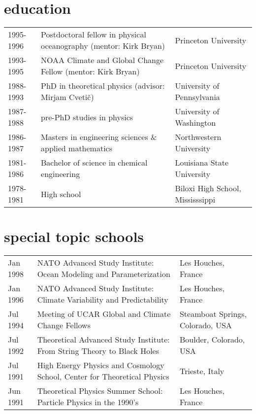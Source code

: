 \documentclass{article}
\begin{document}
\section*{\sc \color{Maroon} education}
\vspace{-.25cm}
\begin{tabular}{lll}
1995-1996  &  Postdoctoral fellow in physical oceanography (mentor: Kirk Bryan) & Princeton University 
\\
1993-1995  &  NOAA Climate and Global Change Fellow (mentor: Kirk Bryan) & Princeton University 
\\
1988-1993  &  PhD in theoretical physics 
(advisor: Mirjam Cveti\v{c}) 
& University of Pennsylvania 
\\
1987-1988  &  pre-PhD studies in physics & University of Washington
\\
1986-1987  &  Masters in engineering sciences \& applied mathematics   & Northwestern University\\
1981-1986  &  Bachelor of science in chemical engineering  & Louisiana State University \\
1978-1981  & High school  & Biloxi High School, Mississsippi
 \end{tabular}


\vspace{-.2cm}
\section*{\sc \color{Maroon} special topic schools}
\vspace{-.25cm}
\begin{tabular}{lll}
Jan 1998  &  NATO Advanced Study Institute: {\sc Ocean Modeling and Parameterization} & Les Houches, France 
\\
Jan 1996 & NATO Advanced Study Institute: {\sc Climate Variability and Predictability} & Les Houches, France
\\
Jul 1994 & Meeting of UCAR Global and Climate Change Fellows & Steamboat Springs, Colorado, USA
\\
Jul 1992 & Theoretical Advanced Study Institute: {\sc From String Theory to Black Holes} & Boulder, Colorado, USA
\\
Jul 1991 & High Energy Physics and Cosmology School, Center for Theoretical Physics & Trieste, Italy
\\
Jun 1991 & Theoretical Physics Summer School: {\sc Particle Physics in the 1990's} & Les Houches, France
 \end{tabular}
\end{document}
